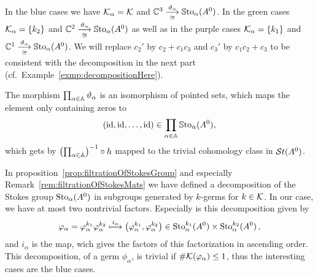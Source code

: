 In the \textcolor{blue!75!black}{blue} cases we have $\mathcal{K}_\alpha=\mathcal{K}$ and
$\mathbb{C}^3\overset{\vartheta_\alpha}{\underset{\cong}{\longrightarrow}}\operatorname{\mathbb{S}to}_\alpha(A^0)$.
In the \textcolor{green!50!black}{green} cases $\mathcal{K}_\alpha=\{k_2\}$ and
$\mathbb{C}^2\overset{\vartheta_\alpha}{\underset{\cong}{\longrightarrow}}\operatorname{\mathbb{S}to}_\alpha(A^0)$
as well as in the \textcolor{purple!75!black}{purple} cases
$\mathcal{K}_\alpha=\{k_1\}$ and
$\mathbb{C}^1\overset{\vartheta_\alpha}{\underset{\cong}{\longrightarrow}}\operatorname{\mathbb{S}to}_\alpha(A^0)$.
We will replace $c_2'$ by $c_2+c_1c_3$ and $c_3'$ by $c_1c_2+c_3$ to be
consistent with the decomposition in the next part
(cf.\ Example~\ref{exmp:decompositionHere}).
\begin{cor}
  The morphism $\prod_{\alpha\in\mathbb{A}}\vartheta_\alpha$ is an isomorphism of
  pointed sets, which maps the element only containing zeros to
  \[
    (\operatorname{id},\operatorname{id},\dots,\operatorname{id})\in\prod_{\alpha\in\mathbb{A}}\operatorname{\mathbb{S}to}_\alpha(A^0),
  \]
  which gets by $\left(\prod_{\alpha\in\mathbb{A}}\right)^{-1}\circ h$ mapped to the
  trivial cohomology class in $\mathcal{S}{}t(A^0)$.
\end{cor}

In proposition~\ref{prop:filtrationOfStokesGroup} and especially
Remark~\ref{rem:filtrationOfStokesMats} we have defined a decomposition of the
Stokes group $\operatorname{Sto}_\alpha(A^0)$ in subgroups generated by $k$-germs for
$k\in\mathcal{K}$.
In our case, we have at most two nontrivial factors. Especially is this
decomposition given by
\[
  \varphi_\alpha=\varphi_\alpha^{k_1} \varphi_\alpha^{k_2}
  \overset{i_\alpha}\longmapsto
    \left(\varphi_\alpha^{k_1},\varphi_\alpha^{k_2}\right)
      \in\operatorname{Sto}_\alpha^{k_1}(A^0)\times\operatorname{Sto}_\alpha^{k_2}(A^0) \,,
\]
and $i_\alpha$ is the map, wich gives the factors of this factorization in
ascending order.
This decomposition, of a germ $\phi_\alpha$, is trivial if
$\#\mathcal{K}(\varphi_\alpha)\leq1$, thus the interesting cases are the
\textcolor{blue!75!black}{blue} cases.

